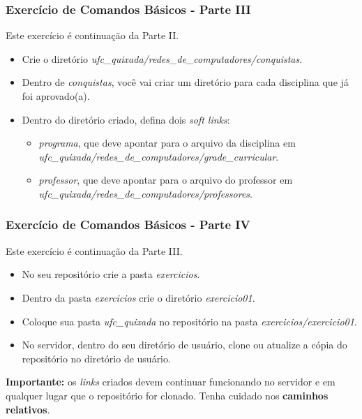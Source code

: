 \documentclass{beamer}
\begin{document}
   \begin{frame}
      \frametitle{Exercício de Comandos Básicos - Parte III}
      Este exercício é continuação da Parte II.
      \begin{itemize}
         \item Crie o diretório \textit{ufc\_quixada/redes\_de\_computadores/conquistas}.
	      \item Dentro de \textit{conquistas}, você vai criar um diretório para cada disciplina que já foi aprovado(a).
         \item Dentro do diretório criado, defina dois \textit{soft links}:
	      \begin{itemize}
	         \item \textit{programa}, que deve apontar para o arquivo da disciplina em \textit{ufc\_quixada/redes\_de\_computadores/grade\_curricular}.
	         \item \textit{professor}, que deve apontar para o arquivo do professor em \textit{ufc\_quixada/redes\_de\_computadores/professores}.
	      \end{itemize}
      \end{itemize}
   \end{frame}

   \begin{frame}
      \frametitle{Exercício de Comandos Básicos - Parte IV}
      Este exercício é continuação da Parte III.
      \begin{itemize}
         \item No seu repositório crie a pasta \textit{exercicios}.
         \item Dentro da pasta \textit{exercicios} crie o diretório \textit{exercicio01}.
         \item Coloque sua pasta \textit{ufc\_quixada} no repositório na pasta \textit{exercicios/exercicio01}.
	      \item No servidor, dentro do seu diretório de usuário, clone ou atualize a cópia do repositório no diretório de usuário.
      \end{itemize}
      \textbf{Importante:} os \textit{links} criados devem continuar funcionando no servidor e em qualquer lugar que o repositório for clonado.
      Tenha cuidado nos \textbf{caminhos relativos}.
   \end{frame}
\end{document}
